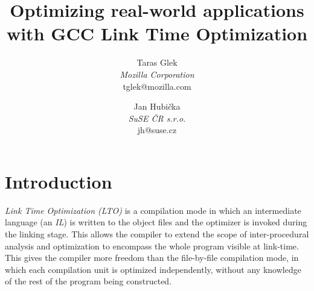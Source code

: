 \documentclass[final]{ols}
\begin{document}

\title{Optimizing real-world applications with GCC Link Time Optimization}
\subtitle{ }  %
\date{}             %


\author{%
Taras Glek\\
{\itshape Mozilla Corporation}\\
{\ttfamily\normalsize tglek@mozilla.com}\\
\and
Jan Hubi\v cka\\
{\itshape SuSE \v CR s.r.o.}\\
{\ttfamily\normalsize jh@suse.cz}\\
} %

\maketitle

\begin{abstract}

\end{abstract}

\section{Introduction}
{\em Link Time Optimization (LTO)} is a compilation mode in which an intermediate
language (an {\em IL}) is written to the object files and the optimizer is invoked
during the linking stage. This allows the compiler to extend the scope of
inter-procedural analysis and optimization to encompass the whole program
visible at link-time. This gives the compiler more freedom than the file-by-file
compilation mode, in which each compilation unit is optimized independently,
without any knowledge of the rest of the program being constructed.
\end{document}
